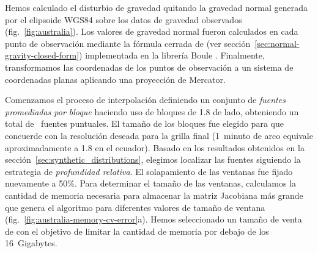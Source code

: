 Hemos calculado el disturbio de gravedad quitando la gravedad normal generada
por el elipsoide WGS84 sobre los datos de gravedad observados
(fig.~\ref{fig:australia}).
Los valores de gravedad normal fueron calculados en cada punto de observación
mediante la fórmula cerrada de \citet{ligotze2001} (ver
sección~\ref{sec:normal-gravity-closed-form}) implementada en la librería Boule
\citep{boule2020}.
Finalmente, transformamos las coordenadas de los puntos de observación a un
sistema de coordenadas planas aplicando una proyección de Mercator.

Comenzamos el proceso de interpolación definiendo un conjunto de \emph{fuentes
promediadas por bloque} haciendo uso de bloques de 1.8\km{} de lado, obteniendo
un total de \AustraliaEqlNSources{}~fuentes puntuales.
El tamaño de los bloques fue elegido para que concuerde con la resolución
deseada para la grilla final (1~minuto de arco equivale aproximadamente
a 1.8\km{} en el ecuador).
Basado en los resultados obtenidos en la sección~\ref{sec:synthetic_distributions},
elegimos localizar las fuentes siguiendo la estrategia de \emph{profundidad
relativa}.
El solapamiento de las ventanas fue fijado nuevamente a 50\%.
Para determinar el tamaño de las ventanas, calculamos la cantidad de memoria
necesaria para almacenar la matriz Jacobiana más grande que genera el algoritmo
para diferentes valores de tamaño de ventana
(fig.~\ref{fig:australia-memory-cv-error}a).
Hemos seleccionado un tamaño de venta de \AustraliaEqlWindowSize{} con el
objetivo de limitar la cantidad de memoria por debajo de los 16~Gigabytes.

